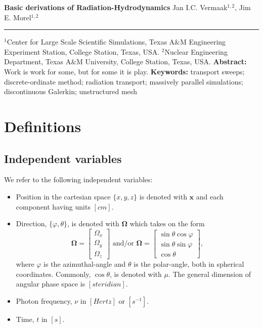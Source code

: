 \documentclass[10pt,letterpaper,notitlepage]{article}
\newcommand{\DOCTITLE}{Basic derivations of Radiation-Hydrodynamics}
\newcommand{\Omegabf}{\mathbf{\Omega}}
\newcommand{\position}{\mathbf{x}}
\begin{document}
\noindent
{\LARGE\textbf{\DOCTITLE}}
\newline
\newline
\newline
\noindent
{\Large Jan I.C. Vermaak$^{1,2}$, Jim E. Morel$^{1,2}$}
\newline
\noindent\rule{\textwidth}{1pt}
{\small $^1$Center for Large Scale Scientific Simulations, Texas A\&M Engineering Experiment Station, College Station, Texas, USA.}
\newline\noindent
{\small $^2$Nuclear Engineering Department, Texas A\&M University, College Station, Texas, USA.}
\newline
\newline
\textbf{Abstract:}\newline\noindent
Work is work for some, but for some it is play.
\newline
\newline\noindent
{\small
\textbf{Keywords:} transport sweeps; discrete-ordinate method; radiation transport; massively parallel simulations; discontinuous Galerkin; unstructured mesh}

\section{Definitions}
\subsection{Independent variables}
We refer to the following independent variables:
\begin{itemize}
\item Position in the cartesian space $\{x,y,z\}$ is denoted with $\position$ and each component having units $[cm]$.
\item Direction, $\{\varphi, \theta\}$, is denoted with $\Omegabf$ which takes on the form 
$$
\Omegabf = 
\begin{bmatrix}
\Omega_x \\ \Omega_y \\ \Omega_z
\end{bmatrix}
\text{ and/or }
\Omegabf = 
\begin{bmatrix}
\sin\theta \cos\varphi \\ \sin\theta \sin\varphi \\ \cos\theta
\end{bmatrix},
$$
where $\varphi$ is the azimuthal-angle and $\theta$ is the polar-angle, both in spherical coordinates. Commonly, $\cos\theta$, is denoted with $\mu$. The general dimension of angular phase space is $[steridian]$.
\item Photon frequency, $\nu$ in $[Hertz]$ or $[s^{-1}]$.
\item Time, $t$ in $[s]$.
\end{itemize} 
\end{document}
